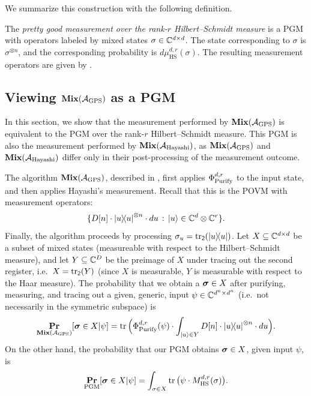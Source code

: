 We summarize this construction with the following definition. 

\begin{definition}
    The \emph{pretty good measurement over the rank-$r$ Hilbert--Schmidt measure} is a PGM with operators labeled by mixed states $\sigma \in \mathbb C^{d \times d}$. The state corresponding to $\sigma$ is $\sigma^{\otimes n}$, and the corresponding probability is $d\mu^{d,r}_{\mathrm{HS}}(\sigma)$. The resulting measurement operators are given by . 
\end{definition}

\subsection{Viewing $\textup{\textbf{Mix}}(\mathcal{A}_{\mathrm{GPS}})$ as a PGM} 

In this section, we show that the measurement performed by $\textup{\textbf{Mix}}(\mathcal{A}_{\mathrm{GPS}})$ is equivalent to the PGM over the rank-$r$ Hilbert--Schmidt measure. This PGM is also the measurement performed by $\textup{\textbf{Mix}}(\mathcal{A}_{\mathrm{Hayashi}})$, as $\textup{\textbf{Mix}}(\mathcal{A}_{\mathrm{GPS}})$ and $\textup{\textbf{Mix}}(\mathcal{A}_{\mathrm{Hayashi}})$ differ only in their post-processing of the measurement outcome. 

The algorithm $\textup{\textbf{Mix}}(\mathcal{A}_{\mathrm{GPS}})$, described in , first applies $\Phi_{\mathrm{Purify}}^{d,r}$ to the input state, and then applies Hayashi's measurement. Recall that this is the POVM with measurement operators: 
\begin{equation*}
    \{ D[n] \cdot \ketbra{u}^{\otimes n} \cdot du \, : \, \ket{u} \in \mathbb C^{d} \otimes \mathbb C^r \}.
\end{equation*}
Finally, the algorithm proceeds by processing $\sigma_u = \tr_{\mathsf{2}}(\ketbra{u})$. Let $X \subseteq \mathbb C^{d\times d}$ be a subset of mixed states (measureable with respect to the Hilbert--Schmidt measure), and let $Y \subseteq \mathbb C^{D}$ be the preimage of $X$ under tracing out the second register, i.e.\ $X = \tr_{\mathsf{2}}(Y)$ (since $X$ is measurable, $Y$ is measurable with respect to the Haar measure). The probability that we obtain a $\boldsymbol{\sigma} \in X$ after purifying, measuring, and tracing out a given, generic, input $\psi\in \mathbb C^{d^n \times d^n}$ (i.e.\ not necessarily in the symmetric subspace) is 
\begin{equation*}
    \mathop{\bf Pr\/}_{\textup{\textbf{Mix}}(\mathcal{A}_{\mathrm{GPS}})}[ \boldsymbol{\sigma} \in X | \psi ] =  \tr \Big( \Phi_{\mathrm{Purify}}^{d,r}( \psi ) \cdot \int_{\ket{u} \in Y} D[n] \cdot \ketbra{u}^{\otimes n}  \cdot du\Big).
\end{equation*}
On the other hand, the probability that our PGM obtains $\boldsymbol{\sigma} \in X$, given input $\psi$, is
\begin{equation*}
    \mathop{\bf Pr\/}_{\mathrm{PGM}} [ \boldsymbol{\sigma} \in X | \psi] = \int_{\sigma \in X} \tr\big( \psi \cdot M^{d,r}_{\mathrm{HS}}(\sigma) \big). 
\end{equation*}

